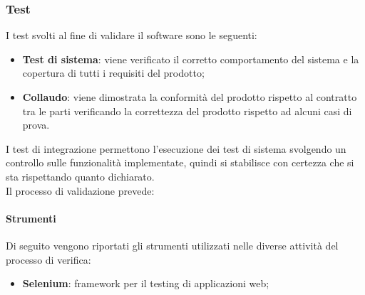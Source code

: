 \subsubsection{Test}
\label{ssub:test}
I test svolti al fine di validare il software sono le seguenti:
\begin{itemize}
	\item \textbf{Test di sistema}: viene verificato il corretto comportamento del sistema e la
    copertura di tutti i requisiti del prodotto;
	\item \textbf{Collaudo}: viene dimostrata la conformità del prodotto rispetto al contratto tra le
    parti verificando la correttezza del prodotto rispetto ad alcuni casi di prova.
\end{itemize}

I test di integrazione permettono l’esecuzione dei test di sistema svolgendo un controllo sulle funzionalità implementate, quindi si stabilisce con certezza che si sta rispettando quanto dichiarato. \\
Il processo di validazione prevede:

\paragraph{Strumenti}
\label{par:validazione:strumenti}

Di seguito vengono riportati gli strumenti utilizzati nelle diverse attività del processo di verifica:
\begin{itemize}
	\item \textbf{Selenium}: framework per il testing di applicazioni web;
\end{itemize}
